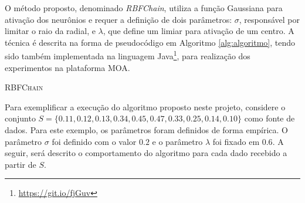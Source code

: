 \documentclass[msc, classic, a4paper]{ufbathesis}
\begin{document}
O método proposto, denominado \textit{RBFChain}, utiliza a função Gaussiana para ativação dos neurônios e requer a definição de dois parâmetros:
\textit{$\sigma$}, responsável por limitar o raio da radial, e \textit{$\lambda$}, que define um limiar para ativação de um centro.
A técnica é descrita na forma de pseudocódigo em Algoritmo \ref{alg:algoritmo},
tendo sido também implementada na linguagem Java\footnote{\url{https://git.io/fjGuv}}, para realização dos experimentos na plataforma MOA.

\vspace{7pt}
\begin{algorithm}[H]
    \SetAlgoLined

    \caption{\textsc{RBFChain}}
    \label{alg:algoritmo}
\end{algorithm}
\vspace{7pt}

Para exemplificar a execução do algoritmo proposto neste projeto, considere o conjunto $S = \{0.11, 0.12, 0.13, 0.34, 0.45, 0.47, 0.33, 0.25, 0.14, 0.10\}$ como fonte de dados.
Para este exemplo, os parâmetros foram definidos de forma empírica. O parâmetro \textit{$\sigma$} foi definido com o valor $0.2$ e o parâmetro \textit{$\lambda$} foi fixado em $0.6$.
A seguir, será descrito o comportamento do algoritmo para cada dado recebido a partir de $S$.
\end{document}
